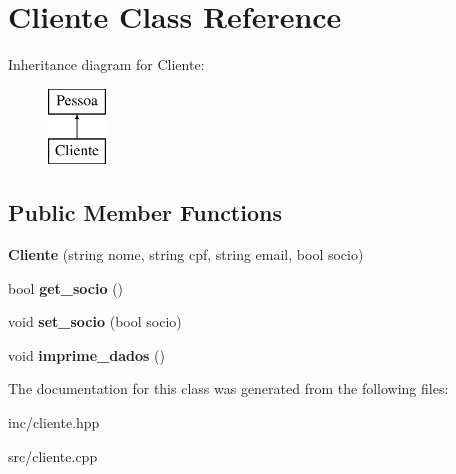 \hypertarget{class_cliente}{}\section{Cliente Class Reference}
\label{class_cliente}
Inheritance diagram for Cliente\+:\begin{figure}[H]
\begin{center}
\leavevmode
\includegraphics[height=2.000000cm]{class_cliente}
\end{center}
\end{figure}
\subsection*{Public Member Functions}
\begin{DoxyCompactItemize}
\item 
\mbox{\label{class_cliente_ae4e880b6374ab92fe40420088b859a89}} 
{\bfseries Cliente} (string nome, string cpf, string email, bool socio)
\item 
\mbox{\label{class_cliente_ac19d3bc1957721f87c5605d33d75c020}} 
bool {\bfseries get\+\_\+socio} ()
\item 
\mbox{\label{class_cliente_a13f1249779395a989ef94541ce73435b}} 
void {\bfseries set\+\_\+socio} (bool socio)
\item 
\mbox{\label{class_cliente_a62328e77ee9e9621db1effdb30d44a9f}} 
void {\bfseries imprime\+\_\+dados} ()
\end{DoxyCompactItemize}


The documentation for this class was generated from the following files\+:\begin{DoxyCompactItemize}
\item 
inc/cliente.\+hpp\item 
src/cliente.\+cpp\end{DoxyCompactItemize}
